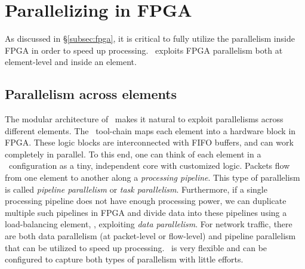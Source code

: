 \section{Parallelizing in FPGA}
\label{sec:optimization}

As discussed in \S\ref{subsec:fpga}, it is critical to fully utilize the parallelism inside FPGA in order to speed up processing.
\name\ exploits FPGA parallelism both at element-level and inside an element.

\subsection{Parallelism across elements}

The modular architecture of \name\ makes it natural to exploit parallelisms across different elements.
The \name\ tool-chain maps each element into a hardware block in FPGA. 
These logic blocks are interconnected with FIFO buffers, and can work completely in parallel.
%
To this end, one can think of each element in a \name\ configuration as a tiny, independent core with customized logic.
Packets flow from one element to another along a \textit{processing pipeline}.
This type of parallelism is called \textit{pipeline parallelism} or \textit{task parallelism}. %
%
Furthermore, if a single processing pipeline does not have enough processing power, we can duplicate multiple such pipelines 
in FPGA and divide data into these pipelines using a load-balancing element, \ie, exploiting \textit{data parallelism}. %
For network traffic, there are both data parallelism (at packet-level or flow-level)
and pipeline parallelism that can be utilized  to speed up processing.
\name\ is very flexible and can be configured to capture both types of parallelism with little efforts.


